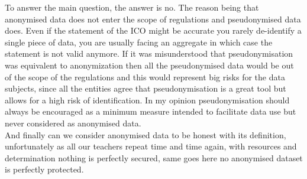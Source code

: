 \documentclass[9pt]{article}
\begin{document}
To answer the main question, the answer is no. The reason being that anonymised data does not enter the scope of regulations and pseudonymised data does. Even if the statement of the ICO might be accurate you rarely de-identify a single piece of data, you are usually facing an aggregate in which case the statement is not valid anymore. If it was misunderstood that pseudonymisation was equivalent to anonymization then all the pseudonymised data would be out of the scope of the regulations and this would represent big risks for the data subjects, since all the entities agree that pseudonymisation is a great tool but allows for a high risk of identification.
In my opinion pseudonymisation should always be encouraged as a minimum measure intended to facilitate data use but never considered as anonymised data.\\
And finally can we consider anonymised data to be honest with its definition, unfortunately as all our teachers repeat time and time again, with resources and determination nothing is perfectly secured, same goes here no anonymised dataset is perfectly protected. 
\end{document}
